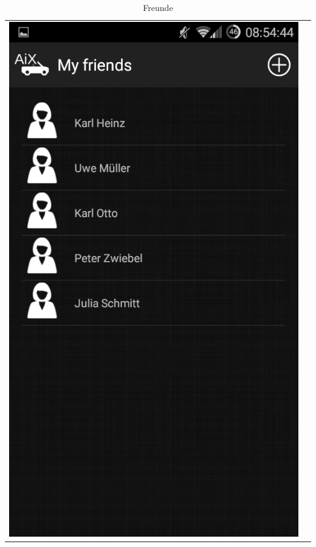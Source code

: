 \documentclass[12pt,a4paper,bibliography=totocnumbered,listof=totocnumbered]{scrartcl}
\begin{document}
\begin{table}
\begin{tabular}{c c}

\begin{minipage}{.5\textwidth}
  \centering
  \includegraphics[scale=0.3]{images/friends.png}
  \caption{Freunde}
  \label{friends}
\end{minipage}
\pagebreak
&
\begin{minipage}{.5\textwidth}
  \centering

\end{minipage}
\end{tabular}
\end{table}
\end{document}

